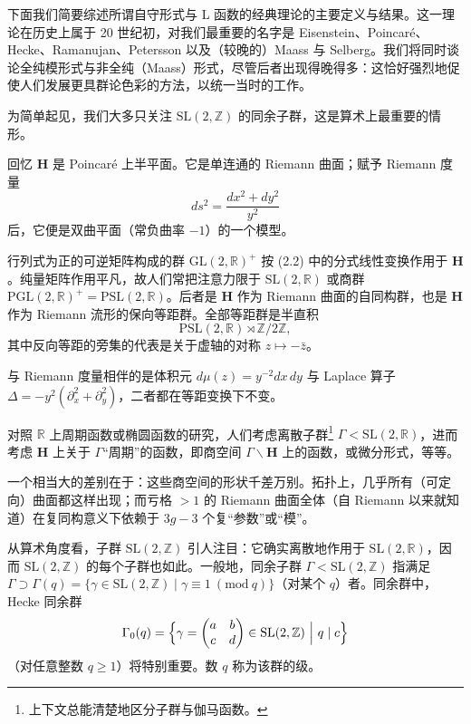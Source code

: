 下面我们简要综述所谓自守形式与 L 函数的经典理论的主要定义与结果。这一理论在历史上属于 20 世纪初，对我们最重要的名字是 Eisenstein、Poincaré、Hecke、Ramanujan、Petersson 以及（较晚的）Maass 与 Selberg。我们将同时谈论全纯模形式与非全纯（Maass）形式，尽管后者出现得晚得多：这恰好强烈地促使人们发展更具群论色彩的方法，以统一当时的工作。

为简单起见，我们大多只关注 $\mathrm{SL}(2,\mathbb{Z})$ 的同余子群，这是算术上最重要的情形。

回忆 $\mathbf{H}$ 是 Poincaré 上半平面。它是单连通的 Riemann 曲面；赋予 Riemann 度量
\[
ds^{2}=\frac{dx^{2}+dy^{2}}{y^{2}}
\]
后，它便是双曲平面（常负曲率 $-1$）的一个模型。

行列式为正的可逆矩阵构成的群 $\mathrm{GL}(2,\mathbb{R})^{+}$ 按 (2.2) 中的分式线性变换作用于 $\mathbf{H}$。纯量矩阵作用平凡，故人们常把注意力限于 $\mathrm{SL}(2,\mathbb{R})$ 或商群 $\mathrm{PGL}(2,\mathbb{R})^{+}=\mathrm{PSL}(2,\mathbb{R})$。后者是 $\mathbf{H}$ 作为 Riemann 曲面的自同构群，也是 $\mathbf{H}$ 作为 Riemann 流形的保向等距群。全部等距群是半直积
\[
\mathrm{PSL}(2,\mathbb{R})\rtimes\mathbb{Z}/2\mathbb{Z},
\]
其中反向等距的旁集的代表是关于虚轴的对称 $z\mapsto-\bar z$。

与 Riemann 度量相伴的是体积元 $d\mu(z)=y^{-2}dx\,dy$ 与 Laplace 算子 $\Delta=-y^{2}(\partial_{x}^{2}+\partial_{y}^{2})$，二者都在等距变换下不变。

对照 $\mathbb{R}$ 上周期函数或椭圆函数的研究，人们考虑离散子群\footnote{上下文总能清楚地区分子群与伽马函数。} $\Gamma<\mathrm{SL}(2,\mathbb{R})$，进而考虑 $\mathbf{H}$ 上关于 $\Gamma$“周期”的函数，即商空间 $\Gamma\backslash\mathbf{H}$ 上的函数，或微分形式，等等。

一个相当大的差别在于：这些商空间的形状千差万别。拓扑上，几乎所有（可定向）曲面都这样出现；而亏格 $>1$ 的 Riemann 曲面全体（自 Riemann 以来就知道）在复同构意义下依赖于 $3g-3$ 个复“参数”或“模”。

从算术角度看，子群 $\mathrm{SL}(2,\mathbb{Z})$ 引人注目：它确实离散地作用于 $\mathrm{SL}(2,\mathbb{R})$，因而 $\mathrm{SL}(2,\mathbb{Z})$ 的每个子群也如此。一般地，同余子群 $\Gamma<\mathrm{SL}(2,\mathbb{Z})$ 指满足 $\Gamma\supset\Gamma(q)=\{\gamma\in\mathrm{SL}(2,\mathbb{Z})\mid\gamma\equiv1\ (\mathrm{mod}\ q)\}$（对某个 $q$）者。同余群中，Hecke 同余群
\[
\Gamma_{0}(q)=\Bigl\{\gamma=\begin{pmatrix}a&b\\c&d\end{pmatrix}\in\mathrm{SL}(2,\mathbb{Z})\ \Big|\ q\mid c\Bigr\}
\]
（对任意整数 $q\ge1$）将特别重要。数 $q$ 称为该群的级。

